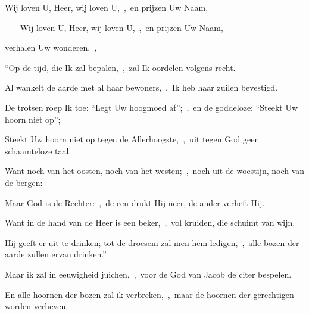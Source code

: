 \documentclass[12pt,twoside,a5paper]{article}
\begin{document}






\begin{halfparskip}
  Wij loven U, Heer, wij loven U,~\sep\ en prijzen Uw Naam,

  ~---  Wij loven U, Heer, wij loven U,~\sep\ en prijzen Uw Naam,

  verhalen Uw wonderen.~\sep

  ``Op de tijd, die Ik zal bepalen,~\sep\ zal Ik oordelen volgens recht.

  Al wankelt de aarde met al haar bewoners,~\sep\ Ik heb haar zuilen bevestigd.

  De trotsen roep Ik toe: ``Legt Uw hoogmoed af'';~\sep\ en de goddeloze: ``Steekt Uw hoorn niet op'';

  Steekt Uw hoorn niet op tegen de Allerhoogste,~\sep\ uit tegen God geen schaamteloze taal.

  Want noch van het oosten, noch van het westen;~\sep\ noch uit de woestijn, noch van de bergen:

  Maar God is de Rechter:~\sep\ de een drukt Hij neer, de ander verheft Hij.

  Want in de hand van de Heer is een beker,~\sep\ vol kruiden, die schuimt van wijn,

  Hij geeft er uit te drinken; tot de droesem zal men hem ledigen,~\sep\ alle bozen der aarde zullen ervan drinken.''

  Maar ik zal in eeuwigheid juichen,~\sep\ voor de God van Jacob de citer bespelen.

  En alle hoornen der bozen zal ik verbreken,~\sep\ maar de hoornen der gerechtigen worden verheven.
\end{halfparskip}
\end{document}
